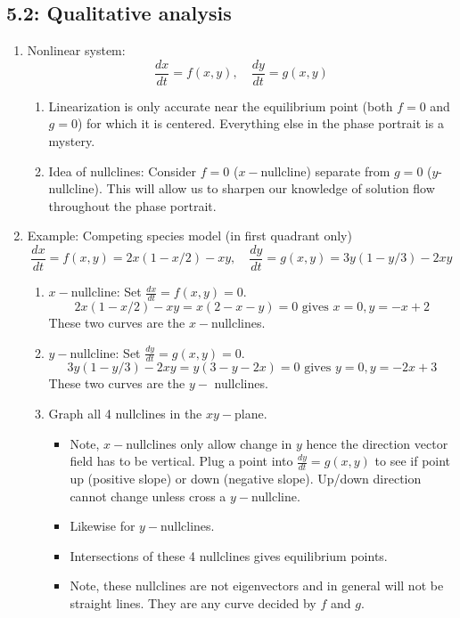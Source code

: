\documentclass{article}
\begin{document}
\subsection{5.2: Qualitative analysis}

\begin{enumerate}

\item Nonlinear system:
\[
\frac{dx}{dt} = f(x,y), \quad \frac{dy}{dt} = g(x,y)
\]
\begin{enumerate}
\item Linearization is only accurate near the equilibrium point (both $f=0$ and $g=0$) for which it is centered. Everything else in the phase portrait is a mystery.
\item Idea of nullclines: Consider $f=0$ ($x-$nullcline) separate from $g=0$ ($y$-nullcline). This will allow us to sharpen our knowledge of solution flow throughout the phase portrait.
\end{enumerate}

\item Example: Competing species model (in first quadrant only)
\[
\frac{dx}{dt} = f(x,y) = 2x(1-x/2)-xy, \quad \frac{dy}{dt}= g(x,y)=3y(1-y/3)-2xy
\]
\begin{enumerate}

\item $x-$nullcline: Set $\frac{dx}{dt}=f(x,y)=0$.
\[
2x(1-x/2)-xy = x(2-x-y)=0 \text{ gives } x=0, y=-x+2
\]
These two curves are the $x-$nullclines. 


\item $y-$nullcline: Set $\frac{dy}{dt}=g(x,y)=0$.
\[
3y(1-y/3)-2xy = y(3-y-2x)=0 \text{ gives } y=0, y=-2x+3
\]
These two curves are the $y-$ nullclines.

\item Graph all 4 nullclines in the $xy-$plane. 
\begin{itemize}
\item Note, $x-$nullclines only allow change in $y$ hence the direction vector field has to be vertical. Plug a point into $\frac{dy}{dt}=g(x,y)$ to see if point up (positive slope) or down (negative slope). Up/down direction cannot change unless cross a $y-$nullcline.
\item Likewise for $y-$nullclines.
\item Intersections of these 4 nullclines gives equilibrium points.
\item Note, these nullclines are not eigenvectors and in general will not be straight lines. They are any curve decided by $f$ and $g$.
\end{itemize}


\end{enumerate}
\end{enumerate}
\end{document}
